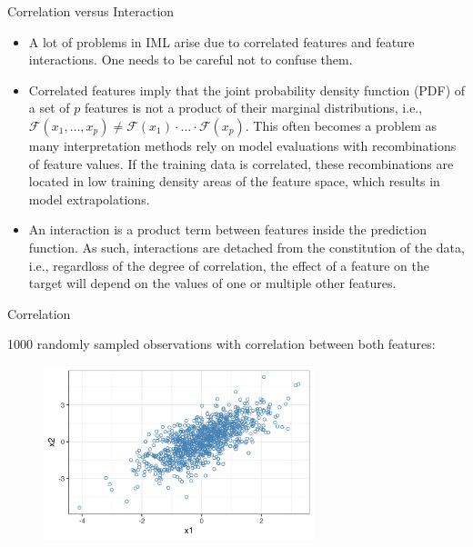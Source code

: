 \documentclass[11pt,compress,t,notes=noshow, xcolor=table]{beamer}
\begin{document}
\begin{vbframe}{Correlation versus Interaction}
\begin{itemize}
\item A lot of problems in IML arise due to correlated features and feature interactions. One needs to be careful not to confuse them.
\item Correlated features imply that the joint probability density function (PDF) of a set of $p$ features is not a product of their marginal distributions, i.e., $\mathcal{F}(x_1, \dots, x_p) \neq \mathcal{F}(x_1) \cdot \ldots \cdot \mathcal{F}(x_p)$. This often becomes a problem as many interpretation methods rely on model evaluations with recombinations of feature values. If the training data is correlated, these recombinations are located in low training density areas of the feature space, which results in model extrapolations.
\item An interaction is a product term between features inside the prediction function. As such, interactions are detached from the constitution of the data, i.e., regardloss of the degree of correlation, the effect of a feature on the target will depend on the values of one or multiple other features.
\end{itemize}
\end{vbframe}

\begin{vbframe}{Correlation}

1000 randomly sampled observations with correlation between both features:

\begin{figure}
\includegraphics[width = 0.7\textwidth]{figure/correlation}
\end{figure}
\end{vbframe}
\end{document}
